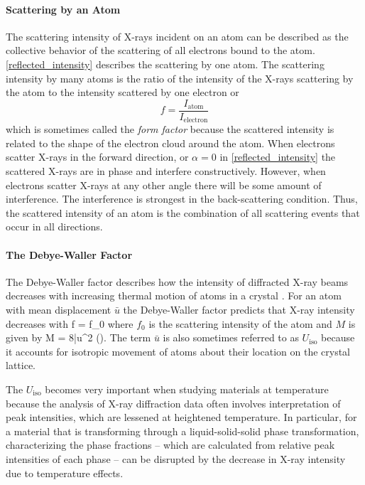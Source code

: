 \paragraph{Scattering by an Atom}
The scattering intensity of X-rays incident on an atom can be described as the collective behavior of the scattering of all electrons bound to the atom. \ref{reflected_intensity} describes the scattering by one atom. The scattering  intensity by many atoms is the ratio of the intensity of the X-rays scattering by the atom to the intensity scattered by one electron or
\begin{equation}
	f = \frac{I_{\text{atom}}}{I_{\text{electron}}}
	\label{form_factor}
\end{equation}
which is sometimes called the \textit{form factor} because the scattered intensity is related to the shape of the electron cloud around the atom. When electrons scatter X-rays in the forward direction, or $\alpha = 0$ in \ref{reflected_intensity} the scattered X-rays are in phase and interfere constructively. However, when electrons scatter X-rays at any other angle there will be some amount of interference. The interference is strongest in the back-scattering condition. Thus, the scattered intensity of an atom is the combination of all scattering events that occur in all directions.

\paragraph{The Debye-Waller Factor}
The Debye-Waller factor describes how the intensity of diffracted X-ray beams decreases with increasing thermal motion of atoms in a crystal \cite{Cullity}. For an atom with mean displacement $\bar u$ the Debye-Waller factor predicts that X-ray intensity decreases with
\eqn
	f = f_0 \exp{\left[-2M\right]}
	\label{debyewaller}
\equ
where $f_0$ is the scattering intensity of the atom and $M$ is given by
\eqn
	M = 8\pi\bar u^2 \left(\frac{\sin\theta}{\lambda}\right). 
	\label{uiso}
\equ
The term $\bar u$ is also sometimes referred to as $U_{\text{iso}}$ because it accounts for isotropic movement of atoms about their location on the crystal lattice.

The $U_{\text{iso}}$ becomes very important when studying materials at temperature because the analysis of X-ray diffraction data often involves interpretation of peak intensities, which are lessened at heightened temperature. In particular, for a material that is transforming through a liquid-solid-solid phase transformation, characterizing the phase fractions -- which are calculated from relative peak intensities of each phase -- can be disrupted by the decrease in X-ray intensity due to temperature effects. 

